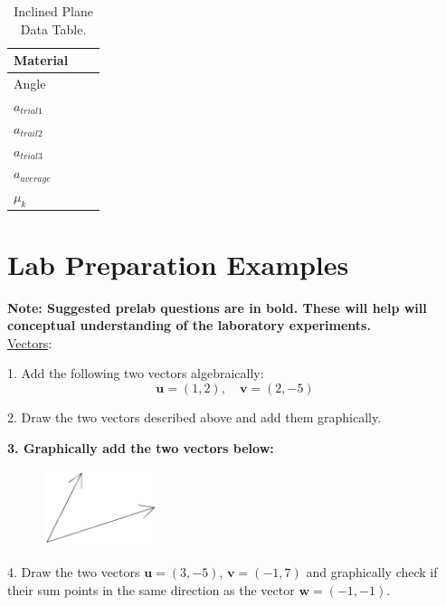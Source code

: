 \begin{table}
\begin{center}
\begin{tabular}{|l |p{5 cm}| p{5 cm} |}
\hline
	Material &  \\
	\hline
	Angle& \\
	\hline
	$a_{trial 1}$& \\
	\hline
	$a_{trail 2}$& \\
	\hline
	$a_{trial 3}$& \\
	\hline
	$a_{average}$& \\
	\hline
	$\mu_k$& \\
	\hline
\end{tabular}
\end{center}
\caption{Inclined Plane Data Table.}
\label{planedatatable}
\end{table}

\section{Lab Preparation Examples}
{\bf{Note: Suggested prelab questions are in bold. These will help will conceptual understanding of the laboratory experiments.}}
\\
\noindent \underline{Vectors}:\myskip

1. Add the following two vectors algebraically:
\begin{equation*}
    \mathbf{u} = (1,2),\quad \mathbf{v} = (2,-5)
\end{equation*}

2. Draw the two vectors described above and add them graphically. \myskip

{\bf{3. Graphically add the two vectors below:}}
\begin{figure}[h]
    \begin{center}
        \includegraphics[width=0.3\textwidth]{./Exp1-4/pic/image4.png}
    \end{center}
\end{figure}

4. Draw the two vectors $\mathbf{u} = (3,-5)$, $\mathbf{v} = (-1,7)$ and graphically check if their sum points in the same direction as the vector $\mathbf{w} = (-1,-1)$.\myskip

